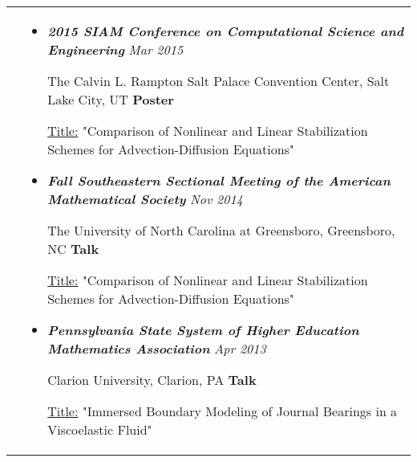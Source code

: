 \documentclass[10pt]{article}
\begin{document}
\vspace*{-\baselineskip}
\hskip-1.7in
\begin{tabularx}{1.5\linewidth}{>{\raggedleft\scshape}p{3cm}X}

  &\begin{itemize}
    \setlength\itemsep{.005em}  
          
\item \textbf{\textit{2015 SIAM Conference on Computational Science and Engineering}} \hspace{20.5 mm}\textit{Mar 2015}
  
            The Calvin L. Rampton Salt Palace Convention Center, Salt Lake City, UT \hspace{23.5 mm} \textbf{Poster}
            
            \underline{Title:} "Comparison of Nonlinear and Linear Stabilization Schemes for Advection-Diffusion Equations"          
             
\item \textbf{\textit{Fall Southeastern Sectional Meeting of the American Mathematical Society}} \hspace{7 mm}\textit{Nov 2014}
  
           The University of North Carolina at Greensboro, Greensboro, NC  \hspace{38.5 mm} \textbf{Talk}
           
        \underline{Title:} "Comparison of Nonlinear and Linear Stabilization Schemes for Advection-Diffusion Equations"
             
  \item \textbf{\textit{Pennsylvania State System of Higher Education Mathematics Association}}    \hspace{9 mm}\textit{Apr 2013}
  
   Clarion University, Clarion, PA \hspace{91.5 mm} \textbf{Talk}
   
	\underline{Title:} "Immersed Boundary Modeling of Journal Bearings in a Viscoelastic Fluid"  
             
  \end{itemize} 

\end{tabularx}
\end{document}
